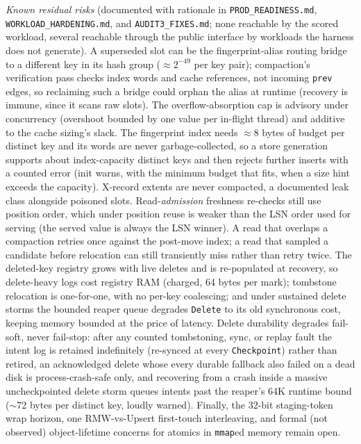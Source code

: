 \documentclass{article}
\begin{document}
\emph{Known residual risks} (documented with rationale in \texttt{PROD\_READINESS.md}, \texttt{WORKLOAD\_HARDENING.md}, and \texttt{AUDIT3\_FIXES.md}; none reachable by the scored workload, several reachable through the public interface by workloads the harness does not generate). A superseded slot can be the fingerprint-alias routing bridge to a different key in its hash group ($\approx 2^{-49}$ per key pair); compaction's verification pass checks index words and cache references, not incoming \texttt{prev} edges, so reclaiming such a bridge could orphan the alias at runtime (recovery is immune, since it scans raw slots). The overflow-absorption cap is advisory under concurrency (overshoot bounded by one value per in-flight thread) and additive to the cache sizing's slack. The fingerprint index needs $\approx$8 bytes of budget per distinct key and its words are never garbage-collected, so a store generation supports about index-capacity distinct keys and then rejects further inserts with a counted error (init warns, with the minimum budget that fits, when a size hint exceeds the capacity). X-record extents are never compacted, a documented leak class alongside poisoned slots. Read-\emph{admission} freshness re-checks still use position order, which under position reuse is weaker than the LSN order used for serving (the served value is always the LSN winner). A read that overlaps a compaction retries once against the post-move index; a read that sampled a candidate before relocation can still transiently miss rather than retry twice. The deleted-key registry grows with live deletes and is re-populated at recovery, so delete-heavy logs cost registry RAM (charged, 64 bytes per mark); tombstone relocation is one-for-one, with no per-key coalescing; and under sustained delete storms the bounded reaper queue degrades \texttt{Delete} to its old synchronous cost, keeping memory bounded at the price of latency. Delete durability degrades fail-soft, never fail-stop: after any counted tombstoning, sync, or replay fault the intent log is retained indefinitely (re-synced at every \texttt{Checkpoint}) rather than retired, an acknowledged delete whose every durable fallback also failed on a dead disk is process-crash-safe only, and recovering from a crash inside a massive uncheckpointed delete storm queues intents past the reaper's 64K runtime bound ($\sim$72 bytes per distinct key, loudly warned). Finally, the 32-bit staging-token wrap horizon, one RMW-vs-Upsert first-touch interleaving, and formal (not observed) object-lifetime concerns for atomics in \texttt{mmap}ed memory remain open.
\end{document}
